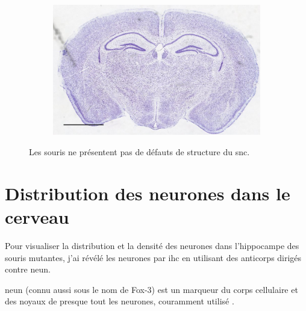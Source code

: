 \begin{figure}[h]
\begin{center}
\begin{subfigure}[h]{0.49\textwidth}
			\end{subfigure}
			\begin{subfigure}[h]{0.49\textwidth}%
				\caption{}
				\label{fig:MaleMutNissl}
				\includegraphics[width=\textwidth]{./Images/Nissl/MaleMut.jpg}
			\end{subfigure}
		\end{center}
		\caption{Les souris \mcrd ne présentent pas de défauts de structure du \acrshort{snc}.}
		\label{fig:NisslResultat}
	\end{figure}
	\FloatBarrier

\section{Distribution des neurones dans le cerveau}
	\label{sec:neun}
	Pour visualiser la distribution et la densité des neurones dans l'hippocampe des souris mutantes, j'ai révélé les neurones par \acrshort{ihc} en utilisant des anticorps dirigés contre \acrshort{neun}.
	
	\Acrshort{neun} (connu aussi sous le nom de Fox-3) est un marqueur du  corps cellulaire et des noyaux de presque tout les neurones, couramment utilisé \cite{Guselnikova2015, Kim2009}.
	
